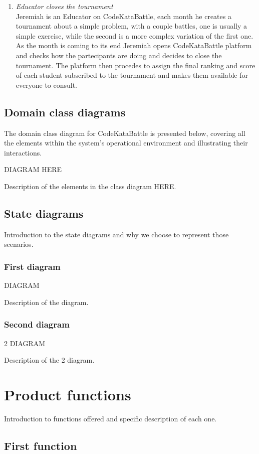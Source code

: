 \documentclass[12pt, a4paper]{report}
\begin{document}
\begin{enumerate}
        \item \textit{Educator closes the tournament} \\
        Jeremiah is an Educator on CodeKataBattle, each month he creates a tournament about a simple problem, with a couple battles,
        one is usually a simple exercise, while the second is a more complex variation of the first one.
        As the month is coming to its end Jeremiah opens CodeKataBattle platform and checks how the partecipants are doing and decides to close the tournament.
        The platform then procedes to assign the final ranking and score of each student subscribed to the tournament and makes them available for everyone to consult. 

    \end{enumerate}

    \subsection{Domain class diagrams}
    The domain class diagram for CodeKataBattle is presented below, covering all the elements within the system's operational environment and illustrating their interactions.

    DIAGRAM HERE

    Description of the elements in the class diagram HERE.

    \subsection{State diagrams}
    Introduction to the state diagrams and why we choose to represent those scenarios. 
    \subsubsection{First diagram}
    DIAGRAM

    Description of the diagram.
    \subsubsection{Second diagram}
    2 DIAGRAM

    Description of the 2 diagram.

    \section{Product functions}
    Introduction to functions offered and specific description of each one. 
    \subsection{First function}
\end{document}
